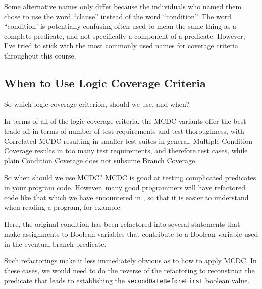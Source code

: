 Some alternative names only differ because the individuals who named them chose
to use the word ``clause'' instead of the word ``condition''. The word
``condition' is potentially confusing often used to mean the same thing as a
complete predicate, and not specifically a component of a predicate. However,
I've tried to stick with the most commonly used names for coverage criteria
throughout this course.


\subsection{When to Use Logic Coverage Criteria}

So which logic coverage criterion, should we use, and when? 


In terms of all of the logic coverage criteria, the MCDC variants offer the best
trade-off in terms of number of test requirements and test thoroughness, with
Correlated MCDC resulting in smaller test suites in general. Multiple Condition
Coverage results in too many test requirements, and therefore test cases, while
plain Condition Coverage does not subsume Branch Coverage.

So when should we use MCDC? MCDC is good at testing complicated predicates in
your program code. However, many good programmers will have refactored code
like that which we have encountered in \daysbetweentwodatesmethod,
so that it is easier to understand when reading a program, for example:


\begin{center} 
\end{center}  

Here, the original condition has been refactored into several statements that
make assignments to Boolean variables that contribute to a Boolean variable used
in the eventual branch predicate.

Such refactorings make it less immediately obvious as to how to apply MCDC. In
these cases, we would need to do the reverse of the refactoring to reconstruct
the predicate that leads to establishing the {\tt secondDateBeforeFirst} boolean
value.

